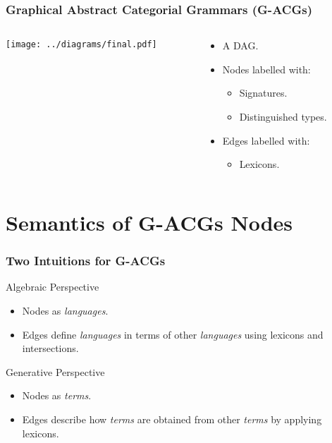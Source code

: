 \documentclass{beamer}
\begin{document}
\begin{frame}
  \frametitle{Graphical Abstract Categorial Grammars (G-ACGs)}

  \begin{columns}[c]
    \begin{column}{0.6\textwidth}
      \begin{center}
        \texttt{[image: ../diagrams/final.pdf]}
      \end{center}
    \end{column}

    \pause

    \begin{column}{0.4\textwidth}
        \begin{itemize}
        \item A DAG.
        \item Nodes labelled with:
          \begin{itemize}
          \item Signatures.
          \item Distinguished types.
          \end{itemize}
        \item Edges labelled with:
          \begin{itemize}
          \item Lexicons.
          \end{itemize}
        \end{itemize}
    \end{column}
  \end{columns}
\end{frame}




\section{Semantics of G-ACGs Nodes}

\begin{frame}
  \frametitle{Two Intuitions for G-ACGs}

  \begin{block}{Algebraic Perspective}
    \begin{itemize}
    \item Nodes as \emph{languages}.
    \item Edges define \emph{languages} in terms of other
      \emph{languages} using lexicons and intersections.
    \end{itemize}
  \end{block}
  \begin{block}{Generative Perspective}
    \begin{itemize}
    \item Nodes as \emph{terms}.
    \item Edges describe how \emph{terms} are obtained from other
      \emph{terms} by applying lexicons.
    \end{itemize}
  \end{block}
\end{frame}
\end{document}
